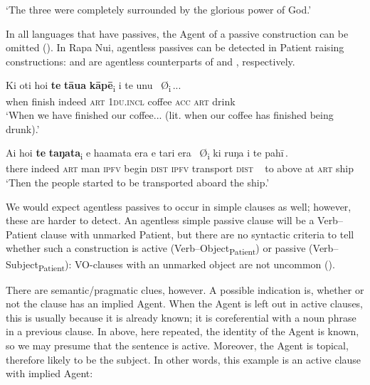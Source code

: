\glt 
‘The three were completely surrounded by the glorious power of God.’ \textstyleExampleref{[Luke 9:31]}
\z

In all languages that have passives, the Agent of a passive construction can be omitted (\citealt[329]{KeenanDryer2007}). In Rapa Nui, agentless passives can be detected in Patient raising constructions:  and  are agentless counterparts of  and , respectively.

\ea\label{ex:8.55}
\gll Ki oti ho{\ꞌ}i \textbf{te} \textbf{tāua} \textbf{kāpē}\textsubscript{\textup{i}} {\ob}i te unu ~\textup{Ø}\textsubscript{\textup{i}}\,{\cb}...\\
when finish indeed \textsc{art} \textsc{1du.incl} coffee {\db}\textsc{acc} \textsc{art} drink \\

\glt 
‘When we have finished our coffee... (lit. when our coffee has finished being drunk).’ \textstyleExampleref{[R301.043]} 
\z

\ea\label{ex:8.56}
\gll {\ꞌ}Ai ho{\ꞌ}i \textbf{te} \textbf{taŋata}\textsubscript{\textup{i}} e ha{\ꞌ}amata era {\ob}e tari era ~\textup{Ø\textsubscript{i}} ki ruŋa i te pahī\,{\cb}.\\
there indeed \textsc{art} man \textsc{ipfv} begin \textsc{dist} {\db}\textsc{ipfv} transport \textsc{dist} ~ to above at \textsc{art} ship\\

\glt
‘Then the people started to be transported aboard the ship.’ \textstyleExampleref{[R210.040]} 
\z

We would expect agentless passives to occur in simple clauses as well; however, these are harder to detect. An agentless simple passive clause will be a Verb–Patient clause with unmarked Patient, but there are no syntactic criteria to tell whether such a construction is active (Verb–Object\textsubscript{Patient}) or passive (Verb–Subject\textsubscript{Patient}): VO-clauses with an unmarked object are not uncommon ().

There are semantic/pragmatic clues, however. A possible indication is, whether or not the clause has an implied Agent. When the Agent is left out in active clauses, this is usually because it is already known; it is coreferential with a noun phrase in a previous clause. In  above, here repeated, the identity of the Agent is known, so we may presume that the sentence is active. Moreover, the Agent is topical, therefore likely to be the subject. In other words, this example is an active clause with implied Agent:

